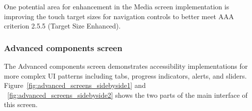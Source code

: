 One potential area for enhancement in the Media screen implementation is improving the touch target sizes for navigation controls to better meet AAA criterion 2.5.5 (Target Size Enhanced).

\subsubsection{Advanced components screen}
\label{subsubsec:advanced-screen}

The Advanced components screen demonstrates accessibility implementations for more complex UI patterns including tabs, progress indicators, alerts, and sliders. Figure~\ref{fig:advanced_screens_sidebyside1} and ~\ref{fig:advanced_screens_sidebyside2}  shows the two parts of the main interface of this screen.

\begin{figure}[ht]
    \centering
    \begin{subfigure}[b]{0.48\textwidth}
        \centering

\end{subfigure}
\end{figure}
